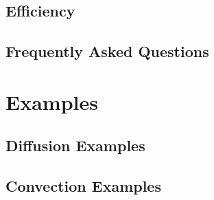 \documentclass[letterpaper,twoside,openright,10pt]{memoir}
\begin{document}
\chapter{Efficiency}
\label{chap:Efficiency}




\chapter{Frequently Asked Questions}
\label{chap:FAQ}




% 
% 
% 



\sloppy

\part{Examples}
\label{part:Examples}



\renewcommand{\ptctitle}{Example Contents}
\parttoc

\chapter{Diffusion Examples}


\label{sec:Examples:diffusion:mesh1D}





\chapter{Convection Examples}



\end{document}
